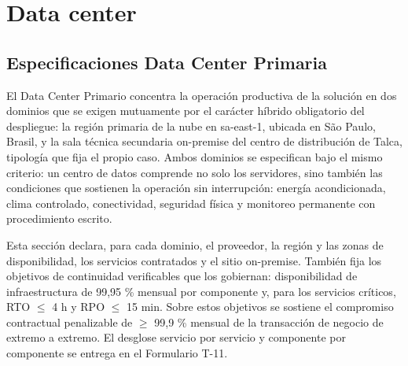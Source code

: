 %

\chapter{Data center}
\label{cap:4-3-data-center}

\ifdefined\LFXtablaprevia\else{}\fi
\setcounter{LFXtablaprevia}{\value{table}}
\let\LFXthetableorig\thetable
\renewcommand{\thetable}{4.3-\arabic{table}}
\setcounter{table}{0}

\section{Especificaciones Data Center Primaria}
\label{sec:d-especificaciones-del-sitio-principal-on-}

El Data Center Primario concentra la operación productiva de la solución en dos dominios que se exigen mutuamente por el carácter híbrido obligatorio del despliegue: la región primaria de la nube en sa-east-1, ubicada en São Paulo, Brasil, y la sala técnica secundaria on-premise del centro de distribución de Talca, tipología que fija el propio caso. Ambos dominios se especifican bajo el mismo criterio: un centro de datos comprende no solo los servidores, sino también las condiciones que sostienen la operación sin interrupción: energía acondicionada, clima controlado, conectividad, seguridad física y monitoreo permanente con procedimiento escrito.

Esta sección declara, para cada dominio, el proveedor, la región y las zonas de disponibilidad, los servicios contratados y el sitio on-premise. También fija los objetivos de continuidad verificables que los gobiernan: disponibilidad de infraestructura de 99,95 \% mensual por componente y, para los servicios críticos, RTO $\leq$ 4 h y RPO $\leq$ 15 min. Sobre estos objetivos se sostiene el compromiso contractual penalizable de $\geq$ 99,9 \% mensual de la transacción de negocio de extremo a extremo. El desglose servicio por servicio y componente por componente se entrega en el Formulario T-11.

